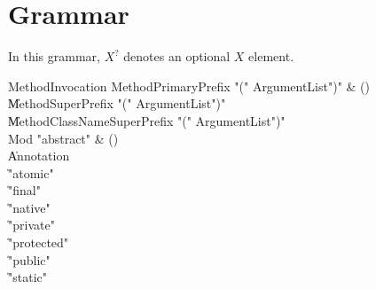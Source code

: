 \chapter{Grammar}
\label{Grammar}

In this grammar, $X^?$ denotes an optional $X$ element.


\begin{bbgrammar}

 MethodInvocation  \label{prod:MethodInvocation}  \: MethodPrimaryPrefix \xcd"(" ArgumentList\opt \xcd")" & ()\\
    \| MethodSuperPrefix \xcd"(" ArgumentList\opt \xcd")"\\
    \| MethodClassNameSuperPrefix \xcd"(" ArgumentList\opt \xcd")"\\
 Mod  \label{prod:Mod}  \: \xcd"abstract" & ()\\
    \| Annotation\\
    \| \xcd"atomic"\\
    \| \xcd"final"\\
    \| \xcd"native"\\
    \| \xcd"private"\\
    \| \xcd"protected"\\
    \| \xcd"public"\\
    \| \xcd"static"\\
\end{bbgrammar}

